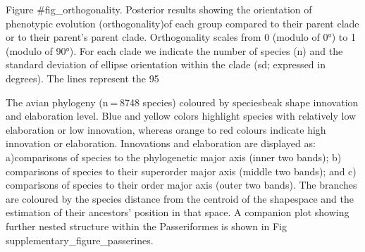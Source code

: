 \documentclass[sn-mathphys]{sn-jnl}%
\theoremstyle{thmstyleone}%
\theoremstyle{thmstyletwo}%
\theoremstyle{thmstylethree}%
\begin{document}
Figure {#fig_orthogonality}. Posterior results showing the orientation of phenotypic evolution (orthogonality)of each group compared to their parent clade or to their parent’s parent clade. Orthogonality scales from 0 (modulo of 0°) to 1 (modulo of 90°). For each clade we indicate the number of species (n) and the standard deviation of ellipse orientation within the clade (sd; expressed in degrees). The lines represent the 95%

The avian phylogeny (n = 8748 species) coloured by speciesbeak shape innovation and elaboration level. Blue and yellow colors highlight species with relatively low elaboration or low innovation, whereas orange to red colours indicate high innovation or elaboration. Innovations and elaboration are displayed as: a)comparisons of species to the phylogenetic major axis (inner two bands); b) comparisons of species to their superorder major axis (middle two bands); and c) comparisons of species to their order major axis (outer two bands). The branches are coloured by the species distance from the centroid of the shapespace and the estimation of their ancestors’ position in that space. A companion plot showing further nested structure within the Passeriformes is shown in Fig {supplementary_figure_passerines}.



\end{document}
